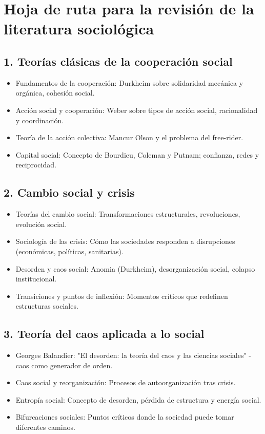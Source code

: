 \documentclass[a4paper,11pt]{article}
\begin{document}
\newpage
\section*{Hoja de ruta para la revisión de la literatura sociológica}

\subsection*{1. Teorías clásicas de la cooperación social}
\begin{itemize}[leftmargin=*, label=--]
    \item Fundamentos de la cooperación: Durkheim sobre solidaridad mecánica y orgánica, cohesión social.
    \item Acción social y cooperación: Weber sobre tipos de acción social, racionalidad y coordinación.
    \item Teoría de la acción colectiva: Mancur Olson y el problema del free-rider.
    \item Capital social: Concepto de Bourdieu, Coleman y Putnam; confianza, redes y reciprocidad.
\end{itemize}

\subsection*{2. Cambio social y crisis}
\begin{itemize}[leftmargin=*, label=--]
    \item Teorías del cambio social: Transformaciones estructurales, revoluciones, evolución social.
    \item Sociología de las crisis: Cómo las sociedades responden a disrupciones (económicas, políticas, sanitarias).
    \item Desorden y caos social: Anomia (Durkheim), desorganización social, colapso institucional.
    \item Transiciones y puntos de inflexión: Momentos críticos que redefinen estructuras sociales.
\end{itemize}

\subsection*{3. Teoría del caos aplicada a lo social}
\begin{itemize}[leftmargin=*, label=--]
    \item Georges Balandier: "El desorden: la teoría del caos y las ciencias sociales" - caos como generador de orden.
    \item Caos social y reorganización: Procesos de autoorganización tras crisis.
    \item Entropía social: Concepto de desorden, pérdida de estructura y energía social.
    \item Bifurcaciones sociales: Puntos críticos donde la sociedad puede tomar diferentes caminos.
\end{itemize}
\end{document}

